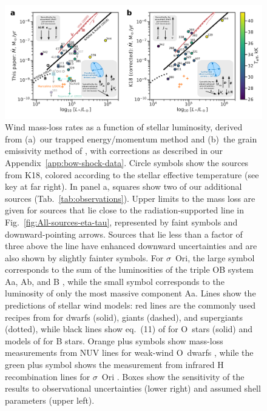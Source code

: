\begin{figure}
  \centering
  \includegraphics[width=\linewidth]{figs/Mdot-vs-lum-combo-edited}
  \caption{Wind mass-loss rates as a function of stellar luminosity,
    derived from (a)~our trapped energy/momentum method and (b)~the
    grain emissivity method of \citet{Kobulnicky:2018a}, with
    corrections as described in our Appendix~\ref{app:bow-shock-data}.
    Circle symbols show the sources from K18, colored according to the
    stellar effective temperature (see key at far right). In panel a,
    squares show two of our additional sources
    (Tab.~\ref{tab:observations}). Upper limits to the mass loss are
    given for sources that lie close to the radiation-supported line
    in Fig.~\ref{fig:All-sources-eta-tau}, represented by faint
    symbols and downward-pointing arrows.  Sources that lie less than
    a factor of three above the line have enhanced downward
    uncertainties and are also shown by slightly fainter symbols.  For
    \(\sigma\)~Ori, the large symbol corresponds to the sum of the
    luminosities of the triple OB system Aa, Ab, and B
    \citep{Simon-Diaz:2015a}, while the small symbol corresponds to
    the luminosity of only the most massive component Aa.  Lines show
    the predictions of stellar wind models: red lines are the commonly
    used recipes from \citet{Vink:2000a} for dwarfs (solid), giants
    (dashed), and supergiants (dotted), while black lines show
    eq.~(11) of \citet{Krticka:2017a} for O~stars (solid) and models
    of \citet{Krticka:2014a} for B stars.  Orange plus symbols show
    mass-loss measurements from NUV lines for weak-wind O~dwarfs
    \citep{Marcolino:2009a}, while the green plus symbol shows the
    measurement from infrared H recombination lines for \(\sigma\)~Ori
    \citep{Najarro:2011a}.  Boxes show the sensitivity of the results
    to observational uncertainties (lower right) and assumed shell
    parameters (upper left).}
  \label{fig:mass-loss-vs-luminosity}
\end{figure}


